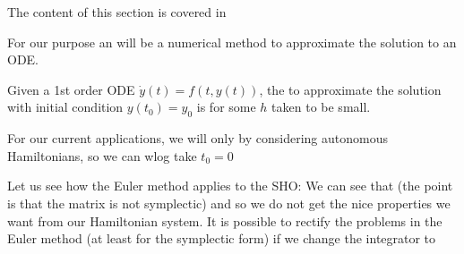 \documentclass{article}
\begin{document}
\begin{remark}
	The content of this section is covered in \cite{Yoshida1992}
\end{remark}

For our purpose an  will be a numerical method to approximate the solution to an ODE. 

\begin{definition}
	Given a 1st order ODE $\dot{y}(t) = f(t,y(t))$, the  to approximate the solution with initial condition $y(t_0)=y_0$ is 
for some $h$ taken to be small. 
\end{definition}

\begin{remark}
	For our current applications, we will only by considering autonomous Hamiltonians, so we can wlog take $t_0=0$ 
\end{remark}

\begin{example}
	Let us see how the Euler method applies to the SHO:
We can see that 
(the point is that the matrix is not symplectic) and so we do not get the nice properties we want from our Hamiltonian system. It is possible to rectify the problems in the Euler method (at least for the symplectic form) if we change the integrator to 
\end{example}
\end{document}
